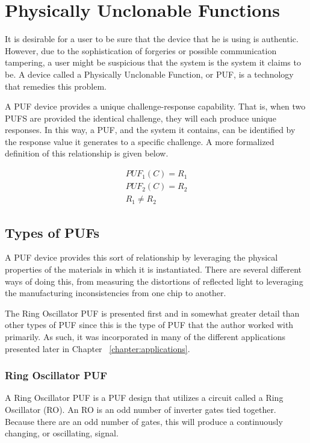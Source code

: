 
\chapter{Physically Unclonable Functions}
\label{chapter:pufoverview}
It is desirable for a user to be sure that the device that he is using is authentic. However, due to the sophistication
of forgeries or possible communication tampering, a user might be suspicious that the system is the system it claims
to be. A device called a Physically Unclonable Function, or PUF, is a technology that remedies this problem.

A PUF device provides a unique challenge-response capability. That is, when two PUFS are provided the identical
challenge, they will each produce unique responses. In this way, a PUF, and the system it contains, 
can be identified by the response value it generates to a specific challenge. A more formalized definition of
this relationship is given below.

\begin{align*}
PUF_1(C) = R_1\\
PUF_2(C) = R_2\\
R_1 \neq R_2
\end{align*}



\section{Types of PUFs}
A PUF device provides this sort of relationship by leveraging the physical properties
of the materials in which it is instantiated. There are several different ways of doing
this, from measuring the distortions of reflected light to leveraging the
manufacturing inconsistencies from one chip to another.

The Ring Oscillator PUF is presented first and in somewhat greater detail than
other types of PUF since this is the type of PUF that the author worked with primarily.
As such, it was incorporated in many of the different applications presented later in
Chapter ~\ref{chapter:applications}.

\subsection{Ring Oscillator PUF}
A Ring Oscillator PUF is a PUF design that utilizes a circuit called a Ring 
Oscillator (RO). An RO is an odd number of inverter gates tied together. Because
there are an odd number of gates, this will produce a continuously changing,
or oscillating, signal. 

